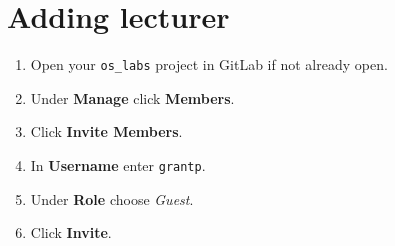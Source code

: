 \section{Adding lecturer}

\begin{enumerate}
\item Open your \texttt{os\_labs} project in GitLab if not already open. 
\item Under \textbf{Manage} click \textbf{Members}.
\item Click \textbf{Invite Members}.
\item In \textbf{Username} enter \texttt{grantp}.
\item Under \textbf{Role} choose \textit{Guest}.
\item Click \textbf{Invite}.
\end{enumerate}